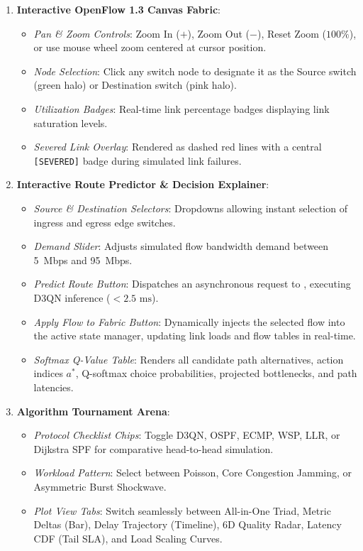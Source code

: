 \documentclass[12pt,a4paper,oneside]{report}
\newcommand{\code}[1]{\relax\ifmmode\text{\ttfamily\nolinkurl{#1}}\else{\ttfamily\nolinkurl{#1}}\fi}
\begin{document}
\begin{enumerate}
    \item \textbf{Interactive OpenFlow 1.3 Canvas Fabric}:
    \begin{itemize}
        \item \textit{Pan \& Zoom Controls}: Zoom In ($+$), Zoom Out ($-$), Reset Zoom ($100\%$), or use mouse wheel zoom centered at cursor position.
        \item \textit{Node Selection}: Click any switch node to designate it as the Source switch (green halo) or Destination switch (pink halo).
        \item \textit{Utilization Badges}: Real-time link percentage badges displaying link saturation levels.
        \item \textit{Severed Link Overlay}: Rendered as dashed red lines with a central \texttt{[SEVERED]} badge during simulated link failures.
    \end{itemize}
    
    \item \textbf{Interactive Route Predictor \& Decision Explainer}:
    \begin{itemize}
        \item \textit{Source \& Destination Selectors}: Dropdowns allowing instant selection of ingress and egress edge switches.
        \item \textit{Demand Slider}: Adjusts simulated flow bandwidth demand between 5~Mbps and 95~Mbps.
        \item \textit{Predict Route Button}: Dispatches an asynchronous request to \code{/api/model_predict}, executing D3QN inference ($<2.5\text{ ms}$).
        \item \textit{Apply Flow to Fabric Button}: Dynamically injects the selected flow into the active state manager, updating link loads and flow tables in real-time.
        \item \textit{Softmax Q-Value Table}: Renders all candidate path alternatives, action indices $a^*$, Q-softmax choice probabilities, projected bottlenecks, and path latencies.
    \end{itemize}
    
    \item \textbf{Algorithm Tournament Arena}:
    \begin{itemize}
        \item \textit{Protocol Checklist Chips}: Toggle D3QN, OSPF, ECMP, WSP, LLR, or Dijkstra SPF for comparative head-to-head simulation.
        \item \textit{Workload Pattern}: Select between Poisson, Core Congestion Jamming, or Asymmetric Burst Shockwave.
        \item \textit{Plot View Tabs}: Switch seamlessly between All-in-One Triad, Metric Deltas (Bar), Delay Trajectory (Timeline), 6D Quality Radar, Latency CDF (Tail SLA), and Load Scaling Curves.
    \end{itemize}
    

\end{enumerate}
\end{document}
